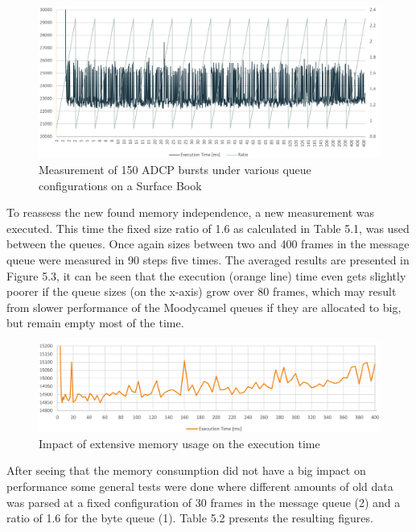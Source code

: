 \begin{figure}[h]
\centering
      \includegraphics[width=1\textwidth]{conf_sb}
        \caption{Measurement of 150 ADCP bursts under various queue configurations on a Surface Book}
\end{figure}

To reassess the new found memory independence, a new measurement was executed. This time the fixed size ratio of 1.6 as calculated in Table 5.1, was used between the queues. Once again sizes between two and 400 frames in the message queue were measured in 90 steps five times. The averaged results are presented in Figure 5.3, it can be seen that the execution (orange line) time even gets slightly poorer if the queue sizes (on the x-axis) grow over 80 frames, which may result from slower performance of the Moodycamel queues if they are allocated to big, but remain empty most of the time.
\vspace{1em}

\begin{figure}[h]
\centering
      \includegraphics[width=1\textwidth]{perf_mem_1}
        \caption{Impact of extensive memory usage on the execution time}
\end{figure}

\pagebreak
After seeing that the memory consumption did not have a big impact on performance some general tests were done where different amounts of old data was parsed at a fixed configuration of 30 frames in the message queue (2) and a ratio of 1.6 for the byte queue (1). Table 5.2 presents the resulting figures. 

